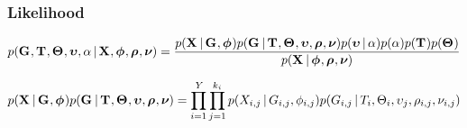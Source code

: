 \begin{frame}[t]
    \frametitle{Likelihood}
    \begin{displaybox}
        \footnotesize
        \[
            p(\geneTreeVector, \divTimeMapVector, \demographicParamVector, 
            \locusMutationRateScalarVector, \locusRateHetShapeParameter \given
            \alignmentVector, \hkyModelVector, \ploidyScalarVector,
            \mutationRateScalarConstantVector) =
            \frac{p(\alignmentVector \given \geneTreeVector, \hkyModelVector)
                p(\geneTreeVector \given \divTimeMapVector, \demographicParamVector,
                \locusMutationRateScalarVector, \ploidyScalarVector,
                \mutationRateScalarConstantVector)
                p(\locusMutationRateScalarVector \given \locusRateHetShapeParameter)
                p(\locusRateHetShapeParameter)
                p(\divTimeMapVector)
                p(\demographicParamVector)}{
                p(\alignmentVector \given \hkyModelVector, \ploidyScalarVector,
                \mutationRateScalarConstantVector)}
        \]\vspace{0mm}
    \end{displaybox}
    \begin{displaybox}
        \footnotesize
        \[
            p(\alignmentVector \given \geneTreeVector, \hkyModelVector)
            p(\geneTreeVector \given \divTimeMapVector,
            \demographicParamVector, \locusMutationRateScalarVector,
            \ploidyScalarVector, \mutationRateScalarConstantVector) =
            \prod_{i=1}^{\npairs{}} \prod_{j=1}^{\nloci{i}} p(\alignment{i}{j}
            \given \geneTree{i}{j}, \hkyModel{i}{j}) p(\geneTree{i}{j} \given
            \divTimeMap{i}, \demographicParams{i}, \locusMutationRateScalar{j},
            \ploidyScalar{i}{j}, \mutationRateScalarConstant{i}{j})
        \]\vspace{0mm}
    \end{displaybox}
\end{frame}

